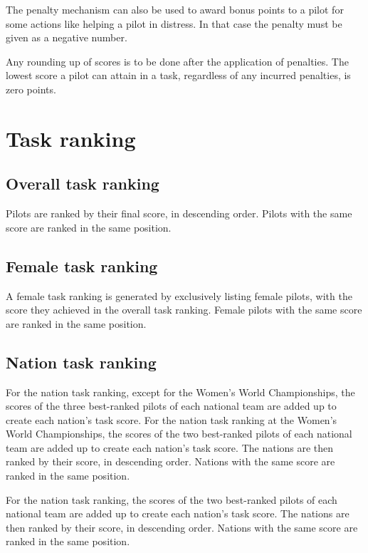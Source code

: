 \documentclass{article}
\begin{document}
The penalty mechanism can also be used to award bonus points to a pilot for
some actions like helping a pilot in distress. In that case the penalty must be
given as a negative number.

Any rounding up of scores is to be done after the application of penalties. The
lowest score a pilot can attain in a task, regardless of any incurred
penalties, is zero points.

\newpage
\section{Task ranking}
\subsection{Overall task ranking}
Pilots are ranked by their final score, in descending order. Pilots with the
same score are ranked in the same position.

\subsection{Female task ranking}
A female task ranking is generated by exclusively listing female pilots, with
the score they achieved in the overall task ranking. Female pilots with the
same score are ranked in the same position.

\subsection{Nation task ranking}
\begin{hg}
For the nation task ranking, except for the Women’s World Championships, the
scores of the three best-ranked pilots of each national team are added up to
create each nation’s task score. For the nation task ranking at the Women’s
World Championships, the scores of the two best-ranked pilots of each national
team are added up to create each nation’s task score. The nations are then
ranked by their score, in descending order. Nations with the same score are
ranked in the same position.
\end{hg}

\begin{pg}
For the nation task ranking, the scores of the two best-ranked pilots of each
national team are added up to create each nation’s task score. The nations are
then ranked by their score, in descending order. Nations with the same score
are ranked in the same position.
\end{pg}
\end{document}
